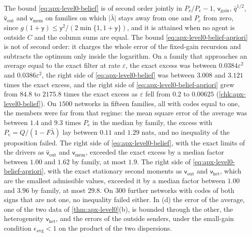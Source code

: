The bound \eqref{eq:apx-level0-belief} is of second order jointly in $P_{\mathrm e}/P_{\mathrm c}-1$, $\mathsf v_{\mathrm{gain}}$, $\bar q^{1/2}$, $\hat{\mathsf v}_{\mathrm{out}}$ and $\mathsf v_{\mathrm{mem}}$ on families on which $\lvert\bar\lambda\rvert$ stays away from one and $P_{\mathrm c}$ from zero, since $g(1+\mathsf y)\le\mathsf y^2/(2\min\{1,1+\mathsf y\})$, and it is attained when no agent is outside $C$ and the column sums are equal. The bound \eqref{eq:apx-level0-belief-apriori} is not of second order: it charges the whole error of the fixed-gain recursion and subtracts the optimum only inside the logarithm. On a family that approaches an average equal to the exact filter at rate $\varepsilon$, the exact excess was between $0.0384\varepsilon^2$ and $0.0386\varepsilon^2$, the right side of \eqref{eq:apx-level0-belief} was between $3.008$ and $3.121$ times the exact excess, and the right side of \eqref{eq:apx-level0-belief-apriori} grew from $84.8$ to $2175.8$ times the exact excess as $\varepsilon$ fell from $0.2$ to $0.00625$ (\cref{chk:apx-level0-belief}). On $1500$ networks in fifteen families, all with codes equal to one, the members were far from that regime: the mean square error of the average was between $1.4$ and $9.3$ times $P_{\mathrm e}$ in the median by family, the excess with $P_{\mathrm c}=Q/(1-F\bar\lambda)$ lay between $0.11$ and $1.29$ nats, and no inequality of the proposition failed. The right side of \eqref{eq:apx-level0-belief}, with the exact limits of the drivers as $\hat{\mathsf v}_{\mathrm{out}}$ and $\mathsf v_{\mathrm{mem}}$, exceeded the exact excess by a median factor between $1.00$ and $1.62$ by family, at most $1.9$. The right side of \eqref{eq:apx-level0-belief-apriori}, with the exact stationary second moments as $\mathsf v_{\mathrm{out}}$ and $\mathsf v_{\mathrm{het}}$, which are the smallest admissible values, exceeded it by a median factor between $1.00$ and $3.96$ by family, at most $29.8$. On $300$ further networks with codes of both signs that are not one, no inequality failed either. In (d) the error of the average, one of the two data of \cref{thm:apx-level0}(b), is bounded through the other, the heterogeneity $\mathsf v_{\mathrm{het}}$, and the errors of the outside senders, under the small-gain condition $\epsilon_{\mathrm{avg}}<1$ on the product of the two dispersions.


